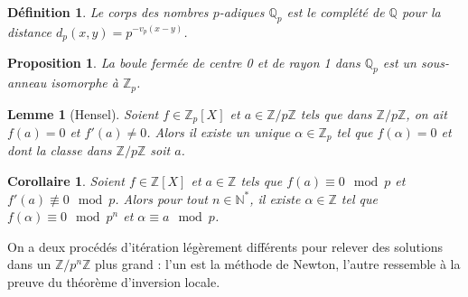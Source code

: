 \documentclass[a4paper, 11pt]{article}
\def\Z{\mathbb{Z}}
\def\N{\mathbb{N}}
\def\Q{\mathbb{Q}}
\newtheorem*{definition}{Définition}
\newtheorem*{proposition}{Proposition}
\newtheorem*{lemma}{Lemme}
\newtheorem*{corollary}{Corollaire}
\begin{document}
\begin{definition}
  Le \emph{corps des nombres $p$-adiques} $\Q_p$ est le complété de
  $\Q$ pour la distance $d_p(x,y) = p^{-v_p(x-y)}$.
\end{definition}
\begin{proposition}
  La boule fermée de centre 0 et de rayon 1 dans $\Q_p$ est un
  sous-anneau isomorphe à $\Z_p$.
\end{proposition}

\begin{lemma}[Hensel]
  Soient $f \in \Z_p[X]$ et $a \in \Z/p\Z$ tels que dans $\Z/p\Z$, on
  ait $f(a) = 0$ et $f'(a) \neq 0$. Alors il existe un unique
  $\alpha \in \Z_p$ tel que $f(\alpha) = 0$ et dont la classe dans
  $\Z/p\Z$ soit $a$.
\end{lemma}

\begin{corollary}
  Soient $f \in \Z[X]$ et $a \in \Z$ tels que $f(a) \equiv 0 \mod p$
  et $f'(a) \not\equiv 0 \mod p$. Alors pour tout $n \in \N^*$, il
  existe $\alpha \in \Z$ tel que $f(\alpha) \equiv 0 \mod p^n$ et
  $\alpha \equiv a \mod p$.
\end{corollary}

On a deux procédés d'itération légèrement différents pour relever des solutions
dans un $\Z/p^n\Z$ plus grand : l'un est la méthode de Newton, l'autre ressemble
à la preuve du théorème d'inversion locale.
\end{document}
